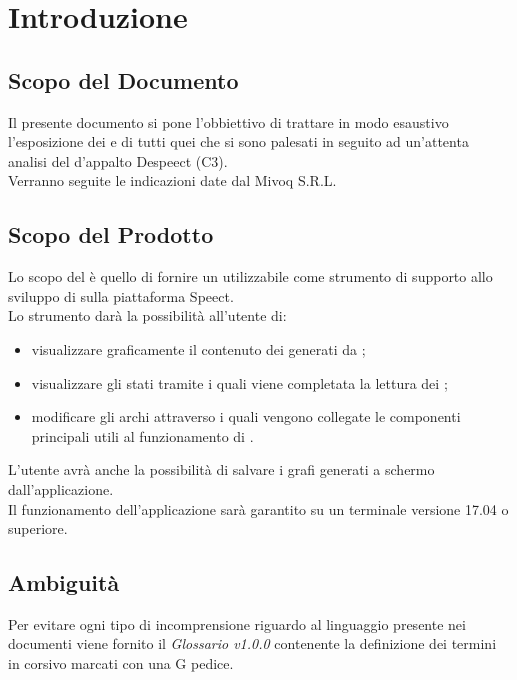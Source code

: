 \documentclass[./AnalisideiRequisiti.tex]{subfiles}
\begin{document}
	
\chapter{Introduzione}
\section{Scopo del Documento}
Il presente documento si pone l’obbiettivo di trattare in modo esaustivo l’esposizione dei  e di tutti quei  che si sono palesati in seguito ad un’attenta analisi del  d’appalto Despeect (C3).
\\ \noindent Verranno seguite le indicazioni date dal  Mivoq S.R.L.

\section{Scopo del Prodotto}

Lo scopo del  è quello di fornire un  utilizzabile come strumento di supporto allo sviluppo di  sulla piattaforma Speect. 
\\ \noindent Lo strumento darà la possibilità all'utente di:
\begin{itemize}
	\item visualizzare graficamente il contenuto dei  generati da ;
	\item visualizzare gli stati tramite i quali viene completata la lettura dei ;
	\item modificare gli archi attraverso i quali vengono collegate le componenti principali utili al funzionamento di .
\end{itemize}
L'utente avrà anche la possibilità di salvare i grafi generati a schermo dall'applicazione.
\\ \noindent Il funzionamento dell'applicazione sarà garantito su un terminale  versione 17.04 o superiore.

\section{Ambiguità}
Per evitare ogni tipo di incomprensione riguardo al linguaggio presente nei documenti viene fornito il \textit{Glossario v1.0.0} contenente la definizione dei termini in corsivo marcati con una G pedice.
\end{document}
